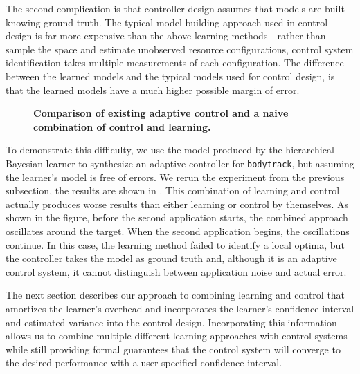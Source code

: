 The second complication is that controller design assumes that models
are built knowing ground truth.  The typical model building approach
used in control design is far more expensive than the above learning
methods---rather than sample the space and estimate unobserved
resource configurations, control system identification takes multiple
measurements of each configuration.  The difference between the
learned models and the typical models used for control design, is that
the learned models have a much higher possible margin of error.  


\begin{figure}
\centering

\caption{\small \bf Comparison of existing adaptive control and a
  naive combination of control and learning.}
\label{fig:not-simple}
\end{figure}

To demonstrate this difficulty, we use the model produced by the
hierarchical Bayesian learner to synthesize an adaptive controller for
\texttt{bodytrack}, but assuming the learner's model is free of
errors.  We rerun the experiment from the previous subsection, the
results are shown in .  This combination of
learning and control actually produces worse results than either
learning or control by themselves.  As shown in the figure, before the
second application starts, the combined approach oscillates around the
target.  When the second application begins, the oscillations
continue.  In this case, the learning method failed to identify a
local optima, but the controller takes the model as ground truth and,
although it is an adaptive control system, it cannot distinguish
between application noise and actual error.

The next section describes our approach to combining learning and
control that amortizes the learner's overhead and incorporates the
learner's confidence interval and estimated variance into the control
design. Incorporating this information allows us to combine multiple
different learning approaches with control systems while still
providing formal guarantees that the control system will converge to
the desired performance with a user-specified confidence interval.
